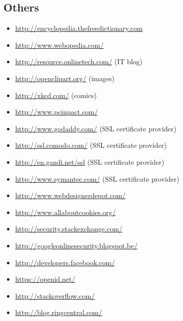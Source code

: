 \subsection*{Others}
\begin{itemize}
\item \url{http://encyclopedia.thefreedictionary.com}
\item \url{http://www.webopedia.com/}

\item \url{http://resource.onlinetech.com/} (IT blog)
\item \url{http://openclipart.org/} (images)
\item \url{http://xkcd.com/} (comics) 
\item \url{http://www.pcinpact.com/}

\item \url{http://www.godaddy.com/} (SSL certificate provider)
\item \url{http://ssl.comodo.com/} (SSL certificate provider)
\item \url{http://en.gandi.net/ssl} (SSL certificate provider)
\item \url{http://www.symantec.com/} (SSL certificate provider)

\item \url{http://www.webdesignerdepot.com/}
\item \url{http://www.allaboutcookies.org/}
\item \url{http://security.stackexchange.com/}
\item \url{http://googleonlinesecurity.blogspot.be/}
\item \url{http://developers.facebook.com/}
\item \url{https://openid.net/}
\item \url{http://stackoverflow.com/}
\item \url{http://blog.ringcentral.com/}

\end{itemize}
